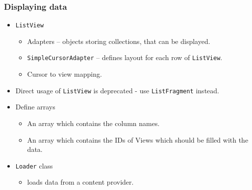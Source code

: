 \documentclass[10pt,xcolor=pdflatex]{beamer}
\begin{document}
\begin{frame}[fragile]\frametitle{Displaying data}
\begin{itemize}
	\item \texttt{ListView}
      \begin{itemize}
    	\item Adapters -- objects storing collections, that can be displayed.
		\item \texttt{SimpleCursorAdapter} -- defines layout for each row of \texttt{ListView}.
		\item Cursor to view mapping.
      \end{itemize}
    \item Direct usage of \texttt{ListView} is deprecated - use \texttt{ListFragment} instead.
    \item Define arrays
      \begin{itemize}
    	\item An array which contains the column names.
		\item An array which contains the IDs of Views which should be filled with the data.
      \end{itemize}
    \item \texttt{Loader} class
      \begin{itemize}
        \item loads data from a content provider.
      \end{itemize}
\end{itemize}
\end{frame}
\end{document}
